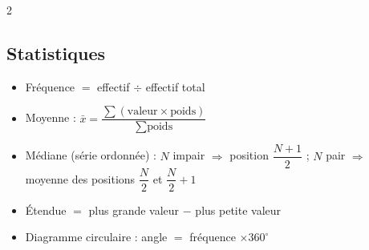 \begin{multicols}{2}
\subsection*{\color{onbo}Statistiques}
\begin{itemize}
\item Fréquence $=$ effectif $\div$ effectif total
\item Moyenne : $\bar x=\dfrac{\sum(\text{valeur}\times\text{poids})}{\sum\text{poids}}$
\item Médiane (série ordonnée) : $N$ impair $\Rightarrow$ position $\dfrac{N+1}2$ ; $N$
pair $\Rightarrow$ moyenne des positions $\dfrac N2$ et $\dfrac N2+1$
\item Étendue $=$ plus grande valeur $-$ plus petite valeur
\item Diagramme circulaire : angle $=$ fréquence $\times360^{\circ}$
\end{itemize}

\end{multicols}
